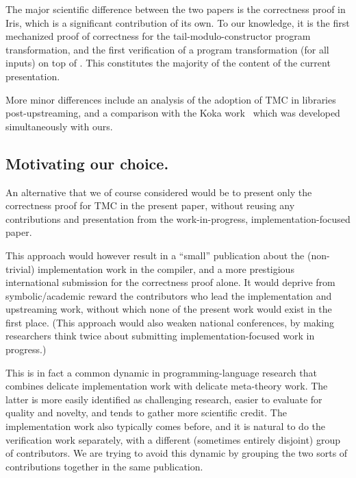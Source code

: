 The major scientific difference between the two papers is the
correctness proof in Iris, which is a significant contribution of its
own. To our knowledge, it is the first mechanized proof of correctness
for the tail-modulo-constructor program transformation, and the first
verification of a program transformation (for all inputs) on top of
\Simuliris. This constitutes the majority of the content of the
current presentation.

More minor differences include an analysis of the adoption of TMC in
\OCaml libraries post-upstreaming, and a comparison with the Koka
work~\citep*{tmc-koka-2023} which was developed simultaneously with
ours.

\subsection{Motivating our choice.}

An alternative that we of course considered would be to present only
the correctness proof for TMC in the present paper, without reusing
any contributions and presentation from the work-in-progress,
implementation-focused paper.

This approach would however result in a ``small'' publication about
the (non-trivial) implementation work in the \OCaml compiler, and
a more prestigious international submission for the correctness proof
alone. It would deprive from symbolic/academic reward the contributors
who lead the implementation and upstreaming work, without which none
of the present work would exist in the first place. (This approach
would also weaken national conferences, by making researchers think
twice about submitting implementation-focused work in progress.)

This is in fact a common dynamic in programming-language research that
combines delicate implementation work with delicate meta-theory
work. The latter is more easily identified as challenging research,
easier to evaluate for quality and novelty, and tends to gather more
scientific credit. The implementation work also typically comes
before, and it is natural to do the verification work separately, with
a different (sometimes entirely disjoint) group of contributors. We
are trying to avoid this dynamic by grouping the two sorts of
contributions together in the same publication.

